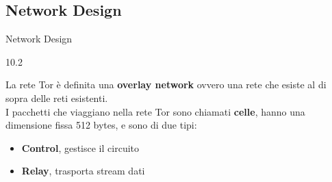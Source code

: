\subsection{Network Design}
\begin{frame}{Network Design}
    \begin{wrapfigure}{1}{0.2\textwidth}
        \centering
        
    \end{wrapfigure}

    La rete Tor è definita una \textbf{overlay network} ovvero una rete che esiste al di sopra delle reti esistenti. \\
    I pacchetti che viaggiano nella rete Tor sono chiamati \textbf{celle}, hanno una dimensione fissa 512 bytes, e sono di due tipi:
    \begin{itemize}
        \item \textbf{Control}, gestisce il circuito
        \item \textbf{Relay}, trasporta stream dati
    \end{itemize}
\end{frame}


